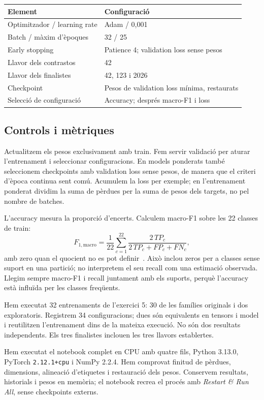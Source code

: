 \documentclass[11pt,a4paper]{article}
\begin{document}
\begin{center}
\begin{tabular}{ll}
\toprule
Element & Configuració\\
\midrule
Optimitzador / learning rate & Adam / 0,001\\
Batch / màxim d'èpoques & 32 / 25\\
Early stopping & Patience 4; validation loss sense pesos\\
Llavor dels contrastos & 42\\
Llavor dels finalistes & 42, 123 i 2026\\
Checkpoint & Pesos de validation loss mínima, restaurats\\
Selecció de configuració & Accuracy; després macro-F1 i loss\\
\bottomrule
\end{tabular}
\end{center}

\subsection*{Controls i mètriques}
Actualitzem els pesos exclusivament amb train. Fem servir validació per aturar l'entrenament i seleccionar configuracions. En models ponderats també seleccionem checkpoints amb validation loss sense pesos, de manera que el criteri d'època continua sent comú. Acumulem la loss per exemple; en l'entrenament ponderat dividim la suma de pèrdues per la suma de pesos dels targets, no pel nombre de batches.

L'accuracy mesura la proporció d'encerts. Calculem macro-F1 sobre les 22 classes de train:
\[
  F_{1,\mathrm{macro}}=\frac{1}{22}\sum_{c=1}^{22}
  \frac{2\,TP_c}{2\,TP_c+FP_c+FN_c},
\]
amb zero quan el quocient no es pot definir~\cite{f1}. Això inclou zeros per a classes sense suport en una partició; no interpretem el seu recall com una estimació observada. Llegim sempre macro-F1 i recall juntament amb els suports, perquè l'accuracy està influïda per les classes freqüents.

Hem executat 32 entrenaments de l'exercici 5: 30 de les famílies originals i dos exploratoris. Registrem 34 configuracions; dues són equivalents en tensors i model i reutilitzen l'entrenament dins de la mateixa execució. No són dos resultats independents. Els tres finalistes inclouen les tres llavors establertes.

Hem executat el notebook complet en CPU amb quatre fils, Python 3.13.0, PyTorch \texttt{2.12.1+cpu} i NumPy 2.2.4. Hem comprovat finitud de pèrdues, dimensions, alineació d'etiquetes i restauració dels pesos. Conservem resultats, historials i pesos en memòria; el notebook recrea el procés amb \emph{Restart \& Run All}, sense checkpoints externs.
\end{document}
